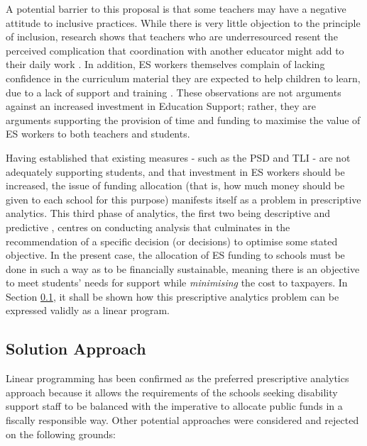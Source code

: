 \documentclass[11pt, a4paper]{article}
\begin{document}
    A potential barrier to this proposal is that some teachers may have a negative attitude to inclusive practices. While there is very little objection to the principle of inclusion, research shows that teachers who are underresourced resent the perceived complication that coordination with another educator might add to their daily work \parencite{teacher_attitudes}. In addition, ES workers themselves complain of lacking confidence in the curriculum material they are expected to help children to learn, due to a lack of support and training \parencite{unimelb_aides}. These observations are not arguments against an increased investment in Education Support; rather, they are arguments supporting the provision of time and funding to maximise the value of ES workers to both teachers and students.

    Having established that existing measures - such as the PSD and TLI - are not adequately supporting students, and that investment in ES workers should be increased, the issue of funding allocation (that is, how much money should be given to each school for this purpose) manifests itself as a problem in prescriptive analytics. This third phase of analytics, the first two being descriptive and predictive \parencite{analytics}, centres on conducting analysis that culminates in the recommendation of a specific decision (or decisions) to optimise some stated objective. In the present case, the allocation of ES funding to schools must be done in such a way as to be financially sustainable, meaning there is an objective to meet students' needs for support while \textit{minimising} the cost to taxpayers. In Section \ref{solution_approach}, it shall be shown how this prescriptive analytics problem can be expressed validly as a linear program.

    \subsection{Solution Approach} \label{solution_approach}

    Linear programming has been confirmed as the preferred prescriptive analytics approach because it allows the requirements of the schools seeking disability support staff to be balanced with the imperative to allocate public funds in a fiscally responsible way. Other potential approaches were considered and rejected on the following grounds:
\end{document}
